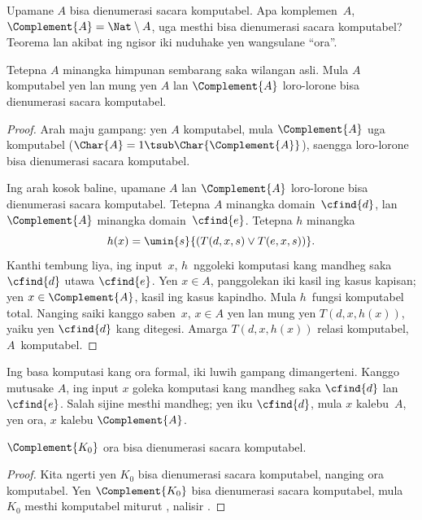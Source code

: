 \documentclass[../../../include/open-logic-section]{subfiles}
\begin{document}

Upamane $A$ bisa dienumerasi sacara komputabel.
Apa komplemen~$A$,
$\Complement{A} = \Nat \setminus A$,
uga mesthi bisa dienumerasi sacara komputabel?
Teorema lan akibat ing ngisor iki nuduhake
yen wangsulane ``ora''.

\begin{thm}
Tetepna $A$ minangka himpunan sembarang
saka wilangan asli. Mula $A$ komputabel yen
lan mung yen $A$ lan $\Complement{A}$
loro-lorone bisa dienumerasi sacara komputabel.
\end{thm}

\begin{proof}
Arah maju gampang: yen $A$ komputabel,
mula $\Complement{A}$ uga komputabel
($\Char{A} = 1 \tsub
\Char{\Complement{A}}$), saengga loro-lorone
bisa dienumerasi sacara komputabel.

Ing arah kosok baline, upamane $A$ lan
$\Complement{A}$ loro-lorone bisa
dienumerasi sacara komputabel. Tetepna
$A$ minangka domain~$\cfind{d}$, lan
$\Complement{A}$ minangka domain~$\cfind{e}$.
Tetepna $h$ minangka
\[
h(x) = \umin{s}{(T(d,x,s) \lor T(e,x,s))}.
\]
Kanthi tembung liya, ing input~$x$,
$h$~nggoleki komputasi kang mandheg saka
$\cfind{d}$ utawa $\cfind{e}$. Yen
$x \in A$, panggolekan iki kasil ing
kasus kapisan; yen $x \in
\Complement{A}$, kasil ing kasus kapindho.
Mula $h$~fungsi komputabel total.
%
Nanging saiki kanggo saben~$x$, $x \in A$
yen lan mung yen $T(d, x, h(x))$,
yaiku yen $\cfind{d}$ kang ditegesi.
Amarga $T(d, x, h(x))$ relasi komputabel,
$A$~komputabel.
\end{proof}

\begin{explain}
Ing basa komputasi kang ora formal,
iki luwih gampang dimangerteni. Kanggo
mutusake $A$, ing input $x$ goleka
%
komputasi kang mandheg saka $\cfind{d}$
lan $\cfind{e}$. Salah sijine mesthi
mandheg; yen iku $\cfind{d}$, mula
$x$ kalebu~$A$, yen ora, $x$ kalebu
$\Complement{A}$.
\end{explain}

\begin{cor}
$\Complement{K_0}$ ora bisa dienumerasi
sacara komputabel.
\end{cor}

\begin{proof}
Kita ngerti yen $K_0$ bisa dienumerasi
sacara komputabel, nanging ora komputabel.
Yen $\Complement{K_0}$ bisa dienumerasi
sacara komputabel, mula $K_0$ mesthi
komputabel miturut ,
nalisir .
\end{proof}
\end{document}
